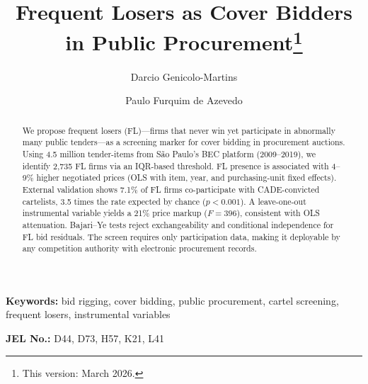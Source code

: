 \begin{frontmatter}

\title{Frequent Losers as Cover Bidders in Public Procurement\texorpdfstring{\footnote{This version: March 2026.}}{}}

\author[insper]{Darcio Genicolo-Martins}
\author[insper]{Paulo Furquim de Azevedo}

\begin{abstract}
We propose frequent losers (FL)---firms that never win yet participate in %
abnormally many public tenders---as a screening marker for cover bidding
in procurement auctions. Using 4.5 million tender-items from S\~ao
Paulo's BEC platform (2009--2019), we identify 2,735 FL firms via an
IQR-based threshold. FL presence is associated with 4--9\% higher
negotiated prices (OLS with item, year, and purchasing-unit fixed
effects). External validation shows 7.1\% of FL firms co-participate
with CADE-convicted cartelists, 3.5 times the rate expected by chance
($p < 0.001$). A leave-one-out instrumental variable yields a 21\%
price markup ($F = 396$), consistent with OLS attenuation. Bajari--Ye
tests reject exchangeability and conditional independence for FL bid
residuals. The screen requires only participation data, making it
deployable by any competition authority with electronic procurement
records.
\end{abstract}

\end{frontmatter}

\noindent\textbf{Keywords:} bid rigging, cover bidding, public procurement, cartel screening, frequent losers, instrumental variables

\noindent\textbf{JEL No.:} D44, D73, H57, K21, L41

\bigskip
